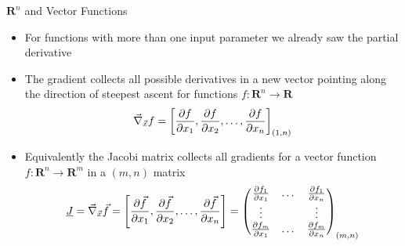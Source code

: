   \begin{frame}{$\mathbf{R}^n$ and Vector Functions}
    \begin{itemize}
      \item For functions with more than one input parameter we already saw the partial derivative
      \item The gradient collects all possible derivatives in a new vector pointing along the direction of steepest ascent for functions $f:\mathbf{R}^n\rightarrow \mathbf{R}$
      \begin{equation*}
        \vec{\nabla}_{\vec{x}} f = \left[
          \frac{\partial f}{\partial x_1}, \frac{\partial f}{\partial x_2}, \dots, \frac{\partial f}{\partial x_n} \right]_{(1, n)}
      \end{equation*}
      \item Equivalently the Jacobi matrix collects all gradients for a vector function $f:\mathbf{R}^n\rightarrow\mathbf{R}^m$ in a $(m, n)$ matrix
      \begin{equation*}
        \underline{J} = \vec{\nabla}_{\vec{x}} \vec{f} = \left[
          \frac{\partial \vec{f}}{\partial x_1}, \frac{\partial \vec{f}}{\partial x_2}, \dots, \frac{\partial \vec{f}}{\partial x_n} \right] =
          \begin{pmatrix}
            \frac{\partial f_1}{\partial x_1} & \dots & \frac{\partial f_1}{\partial x_n} \\
            \vdots & & \vdots \\
            \frac{\partial f_m}{\partial x_1} & \dots & \frac{\partial f_m}{\partial x_n}
          \end{pmatrix}_{(m, n)}
      \end{equation*}
    \end{itemize}
  \end{frame}

